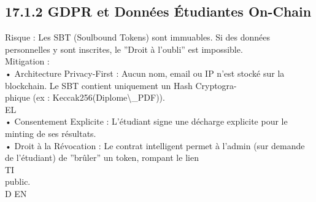 \subsection{17.1.2 GDPR et Données Étudiantes On-Chain}
Risque : Les SBT (Soulbound Tokens) sont immuables. Si des données personnelles y sont inscrites, le ”Droit à l’oubli” est impossible.\\
Mitigation :\\
\vspace{0.5em}
• Architecture Privacy-First : Aucun nom, email ou IP n’est stocké sur la blockchain. Le SBT contient uniquement un Hash Cryptogra-\\
phique (ex : Keccak256(Diplome\textbackslash{}_PDF)).\\
\vspace{0.5em}
\vspace{0.5em}
\vspace{0.5em}
\vspace{0.5em}
EL\\
• Consentement Explicite : L’étudiant signe une décharge explicite pour le minting de ses résultats.\\
\vspace{0.5em}
• Droit à la Révocation : Le contrat intelligent permet à l’admin (sur demande de l’étudiant) de ”brûler” un token, rompant le lien\\
\vspace{0.5em}
\vspace{0.5em}
\vspace{0.5em}
\vspace{0.5em}
TI\\
public.\\
\vspace{0.5em}
\vspace{0.5em}
\vspace{0.5em}
\vspace{0.5em}
D    EN\\
